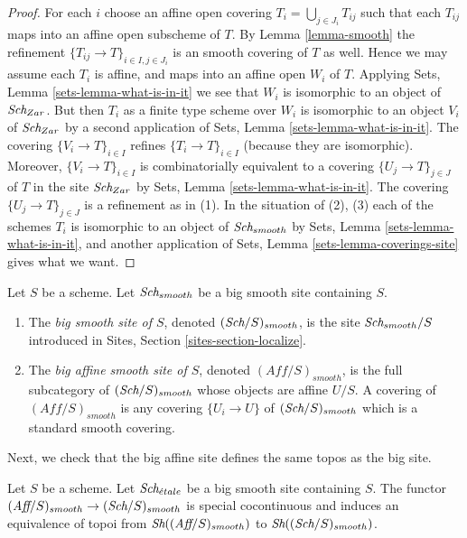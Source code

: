 \begin{proof}
For each $i$ choose an affine open covering $T_i = \bigcup_{j \in J_i} T_{ij}$
such that each $T_{ij}$ maps into an affine open subscheme of $T$. By
Lemma \ref{lemma-smooth}
the refinement $\{T_{ij} \to T\}_{i \in I, j \in J_i}$ is an smooth covering
of $T$ as well. Hence we may assume each $T_i$ is affine, and maps into
an affine open $W_i$ of $T$. Applying
Sets, Lemma \ref{sets-lemma-what-is-in-it}
we see that $W_i$ is isomorphic to an object of $\textit{Sch}_{Zar}$.
But then $T_i$ as a finite type scheme over $W_i$
is isomorphic to an object $V_i$ of $\textit{Sch}_{Zar}$ by a second
application of
Sets, Lemma \ref{sets-lemma-what-is-in-it}.
The covering $\{V_i \to T\}_{i \in I}$ refines $\{T_i \to T\}_{i \in I}$
(because they are isomorphic).
Moreover, $\{V_i \to T\}_{i \in I}$ is combinatorially equivalent to a
covering $\{U_j \to T\}_{j \in J}$ of $T$ in the site
$\textit{Sch}_{Zar}$ by
Sets, Lemma \ref{sets-lemma-what-is-in-it}.
The covering $\{U_j \to T\}_{j \in J}$ is a refinement as in (1).
In the situation of (2), (3) each of the
schemes $T_i$ is isomorphic to an object of $\textit{Sch}_{smooth}$ by
Sets, Lemma \ref{sets-lemma-what-is-in-it},
and another application of
Sets, Lemma \ref{sets-lemma-coverings-site}
gives what we want.
\end{proof}

\begin{definition}
\label{definition-big-small-smooth}
Let $S$ be a scheme. Let $\textit{Sch}_{smooth}$ be a big smooth
site containing $S$.
\begin{enumerate}
\item The {\it big smooth site of $S$}, denoted
$(\textit{Sch}/S)_{smooth}$, is the site $\textit{Sch}_{smooth}/S$
introduced in Sites, Section \ref{sites-section-localize}.
\item The {\it big affine smooth site of $S$}, denoted
$(\textit{Aff}/S)_{smooth}$, is the full subcategory of
$(\textit{Sch}/S)_{smooth}$ whose objects are affine $U/S$.
A covering of $(\textit{Aff}/S)_{smooth}$ is any covering
$\{U_i \to U\}$ of $(\textit{Sch}/S)_{smooth}$ which is a
standard smooth covering.
\end{enumerate}
\end{definition}

\noindent
Next, we check that the big affine site defines the same
topos as the big site.

\begin{lemma}
\label{lemma-affine-big-site-smooth}
Let $S$ be a scheme. Let $\textit{Sch}_{\acute{e}tale}$ be a big smooth
site containing $S$.
The functor
$(\textit{Aff}/S)_{smooth} \to (\textit{Sch}/S)_{smooth}$
is special cocontinuous and induces an equivalence of topoi from
$\mathop{\textit{Sh}}\nolimits((\textit{Aff}/S)_{smooth})$ to
$\mathop{\textit{Sh}}\nolimits((\textit{Sch}/S)_{smooth})$.
\end{lemma}

